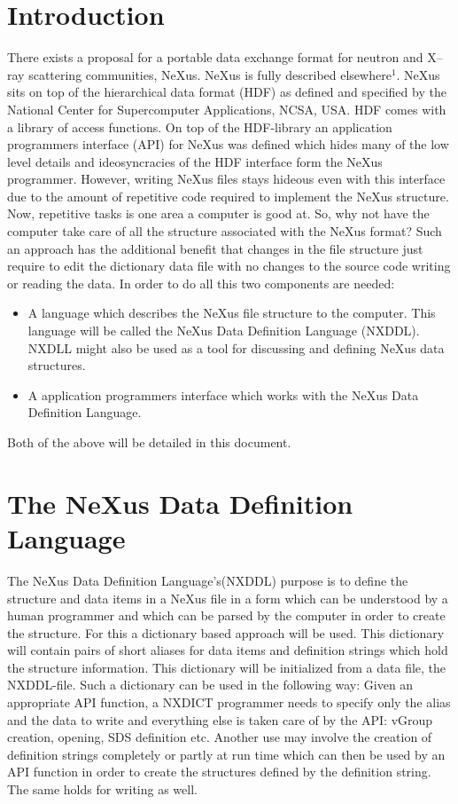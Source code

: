 \documentclass[12pt]{article}
\begin{document}
\section{Introduction}
 There exists a proposal for a portable data exchange format for neutron and
 X--ray scattering communities, NeXus. NeXus is fully described
 elsewhere$^{1}$. NeXus sits on top of the hierarchical data format (HDF) as
 defined and specified by the National Center for Supercomputer Applications, 
 NCSA, USA. HDF comes with a library of access functions. On top of the
 HDF-library an application programmers interface (API) for NeXus was
 defined which hides many of the low level details and ideosyncracies of
 the HDF interface form the NeXus programmer. However, writing NeXus files stays
 hideous even with this interface due to the amount of repetitive code
 required to  implement the NeXus structure. Now, repetitive tasks is one
 area a computer is good at. So, why not have the computer take care of all
 the structure associated with the NeXus format? Such an approach has the 
additional benefit that changes in the file structure just require to edit
the dictionary data file with no changes to the source code writing or
reading the data. In order to do all this two
 components are needed:
\begin{itemize}
\item A language which describes the NeXus file structure to the computer.
  This language will be called the NeXus Data Definition Language (NXDDL).
  NXDLL might also be used as a tool for discussing and defining NeXus
  data structures.
\item A application programmers interface which works with the NeXus Data 
 Definition Language.
\end{itemize}
Both of the above will be detailed in this document.

\section{The NeXus Data Definition Language}
The NeXus Data Definition Language's(NXDDL) purpose is to define the structure
and data items in a NeXus file in a form which can be understood by a human
programmer and which can be parsed by the computer in order to create the 
structure. 
For this a dictionary based approach will be used. This dictionary
will contain pairs of short aliases for data items and definition strings 
which hold the structure information. This dictionary will
be initialized from a data file, the NXDDL-file. Such a dictionary can be
used in the following way: Given an appropriate API function, a NXDICT
programmer  needs to specify only the alias and the data to write and 
everything else is taken care of by the API: vGroup creation, opening,
SDS definition etc. Another use may involve the creation of definition
strings
completely or partly at run time which can then be used by an API function
in order to create the structures defined by the definition string. The same
holds for writing as well.
\end{document}
